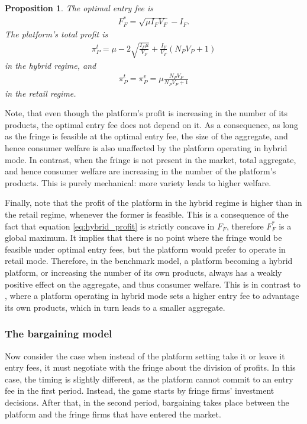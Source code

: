 \documentclass[a4paper]{article}
\newtheorem{proposition}{Proposition}
\begin{document}
\begin{proposition}
    The optimal entry fee is
    \begin{align*}
        F_F^* = \sqrt{\mu I_F V_F} - I_F.
    \end{align*}
    The platform's total profit is
    \begin{align*}
        \pi_P^{t} = \mu - 2\sqrt{\frac{I_F \mu}{V_F}} + \frac{I_F}{V_F} (N_P V_P + 1)
    \end{align*}
    in the hybrid regime, and
    \begin{align*}
        \pi_P^{t} = \pi_P^{v} = \mu \frac{ N_P V_P}{N_P V_P + 1}
    \end{align*}
    in the retail regime.
\end{proposition}
Note, that even though the platform's profit is increasing in the number of its products, the optimal entry fee does not depend on it.
As a consequence, as long as the fringe is feasible at the optimal entry fee, the size of the aggregate, and hence consumer welfare is also unaffected by the platform operating in hybrid mode.
In contrast, when the fringe is not present in the market, total aggregate, and hence consumer welfare are increasing in the number of the platform's products.
This is purely mechanical: more variety leads to higher welfare.

Finally, note that the profit of the platform in the hybrid regime is higher than in the retail regime, whenever the former is feasible.
This is a consequence of the fact that equation \eqref{eq:hybrid_profit} is strictly concave in $F_F$, therefore $F_F^*$ is a global maximum.
It implies that there is no point where the fringe would be feasible under optimal entry fees, but the platform would prefer to operate in retail mode.
Therefore, in the benchmark model, a platform becoming a hybrid platform, or increasing the number of its own products, always has a weakly positive effect on the aggregate, and thus consumer welfare.
This is in contrast to \textcite{anderson2021hybrid}, where a platform operating in hybrid mode sets a higher entry fee to advantage its own products, which in turn leads to a smaller aggregate.


\subsubsection{The bargaining model}

Now consider the case when instead of the platform setting take it or leave it entry fees, it must negotiate with the fringe about the division of profits.
In this case, the timing is slightly different, as the platform cannot commit to an entry fee in the first period.
Instead, the game starts by fringe firms' investment decisions.
After that, in the second period, bargaining takes place between the platform and the fringe firms that have entered the market.
\end{document}
